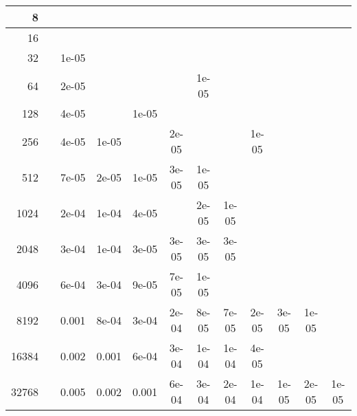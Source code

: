 \begin{appendices}
\begin{table}[H]
{\begin{tabular}{r|ccccccccccc}
8 &&&&&&&&&&&\\\hline

16 &&&&&&&&&&&\\\hline

32 &&1e-05 &&&&&&&&&\\\hline

64 &&2e-05 &&&&1e-05 &&&&&\\\hline

128 &&4e-05 &&1e-05 &&&&&&&\\\hline

256 &&4e-05 &1e-05 &&2e-05 &&&1e-05 &&&\\\hline

512 &&7e-05 &2e-05 &1e-05 &3e-05 &1e-05 &&&&&\\\hline

1024 &&2e-04 &1e-04 &4e-05 &&2e-05 &1e-05 &&&&\\\hline

2048 &&3e-04 &1e-04 &3e-05 &3e-05 &3e-05 &3e-05 &&&&\\\hline

4096 &&6e-04 &3e-04 &9e-05 &7e-05 &1e-05 &&&&&\\\hline

8192 &&0.001 &8e-04 &3e-04 &2e-04 &8e-05 &7e-05 &2e-05 &3e-05 &1e-05 &\\\hline

16384 &&0.002 &0.001 &6e-04 &3e-04 &1e-04 &1e-04 &4e-05 &&&\\\hline

32768 &&0.005 &0.002 &0.001 &6e-04 &3e-04 &2e-04 &1e-04 &1e-05 &2e-05 &1e-05\\\hline

\end{tabular}
}
\end{table}




%


\end{appendices}

